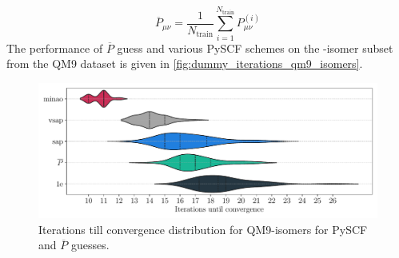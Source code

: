 \begin{equation}
    \label{eq:avg_guess}
    \overline{P}_{\mu\nu} = \frac{1}{N_\text{train}} \sum_{i=1}^{N_\text{train}} P^{(i)}_{\mu\nu}
\end{equation}
The performance of $\overline{P}$ guess and various PySCF schemes on the -isomer subset from the QM9 dataset is given in \autoref{fig:dummy_iterations_qm9_isomers}. 
\begin{figure}[H]
    \centering
    \includegraphics[width=\textwidth]{../fig/gnn/0_d_model_iteration_count.pdf}
    \caption[Iterations till convergence distribution for QM9-isomers]{Iterations till convergence distribution for QM9-isomers for PySCF and $\overline{P}$ guesses.}
    \label{fig:dummy_iterations_qm9_isomers}
\end{figure}